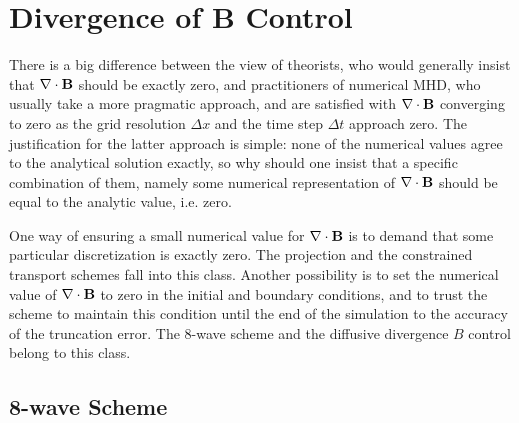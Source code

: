 \section{Divergence of B Control \label{section:divb}}

There is a big difference between the view of theorists,
who would generally insist that $\nabla\cdot\mathbf{B}$ should be exactly zero, and
practitioners of numerical MHD, who usually take a more pragmatic approach,
and are satisfied with $\nabla\cdot\mathbf{B}$ converging to zero as
the grid resolution $\Delta x$ and the time step $\Delta t$ approach zero.
The justification for the latter approach is simple:
none of the numerical values agree to the analytical solution exactly,
so why should one insist that a specific combination of them,
namely some numerical representation of $\nabla\cdot\mathbf{B}$ should be equal
to the analytic value, i.e. zero.

One way of ensuring a small numerical value for $\nabla\cdot\mathbf{B}$ is
to demand that some particular discretization is exactly zero.
The projection and the constrained transport schemes fall into this 
class.
Another possibility is to set the numerical value of $\nabla\cdot\mathbf{B}$ to zero in the
initial and boundary conditions, and to trust the scheme to maintain this
condition until the end of the simulation to the accuracy of the truncation
error. The 8-wave scheme and the diffusive divergence $B$ control belong
to this class.

\subsection{8-wave Scheme \label{section:8wave}}

